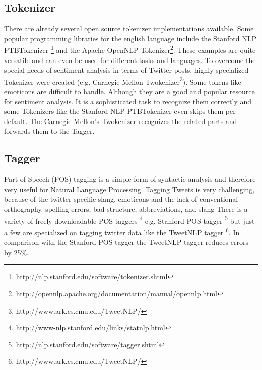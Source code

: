 \subsection{Tokenizer}
There are already several open source tokenizer implementations
available. Some popular programming libraries for the english 
language include the Stanford NLP PTBTokenizer
\footnote{http://nlp.stanford.edu/software/tokenizer.shtml} 
and the Apache OpenNLP Tokenizer\footnote{http://opennlp.apache.org/documentation/manual/opennlp.html}.
These examples are quite versatile and can even be
used for different tasks and languages.
To overcome the special needs of sentiment analysis in terms of Twitter posts,
highly specialized Tokenizer were created (e.g. Carnegie 
Mellon Twokenizer\footnote{http://www.ark.cs.cmu.edu/TweetNLP/}).
Some tokens like emoticons are difficult to handle. Although they 
are a good and popular resource for sentiment analysis. \autocite{emoticons}
It is a sophisticated task to recognize them correctly and some Tokenizers 
like the Stanford NLP PTBTokenizer even skips them per default. 
The Carnegie Mellon's Twokenizer recognizes the related parts and
forwards them to the Tagger.

\subsection{Tagger}
Part-of-Speech (POS) tagging is a simple form of syntactic analysis and therefore
very useful for Natural Language Processing.
Tagging Tweets is very challenging, because of the twitter specific slang, emoticons and the lack of conventional orthography.
spelling errors, bad structure, abbreviations, and slang
There is a variety of freely downloadable POS taggers
\footnote{http://www-nlp.stanford.edu/links/statnlp.html} e.g. Stanford POS tagger
\footnote{http://nlp.stanford.edu/software/tagger.shtml}
 but just a few are specialized on tagging twitter data like the TweetNLP tagger
\footnote{http://www.ark.cs.cmu.edu/TweetNLP/}. In comparison with the Stanford POS tagger the TweetNLP tagger
 reduces errors by 25\%.



